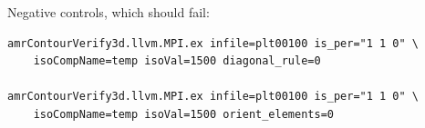 Negative controls, which should fail:

\begin{lstlisting}[style=sh]
amrContourVerify3d.llvm.MPI.ex infile=plt00100 is_per="1 1 0" \
    isoCompName=temp isoVal=1500 diagonal_rule=0

amrContourVerify3d.llvm.MPI.ex infile=plt00100 is_per="1 1 0" \
    isoCompName=temp isoVal=1500 orient_elements=0
\end{lstlisting}
